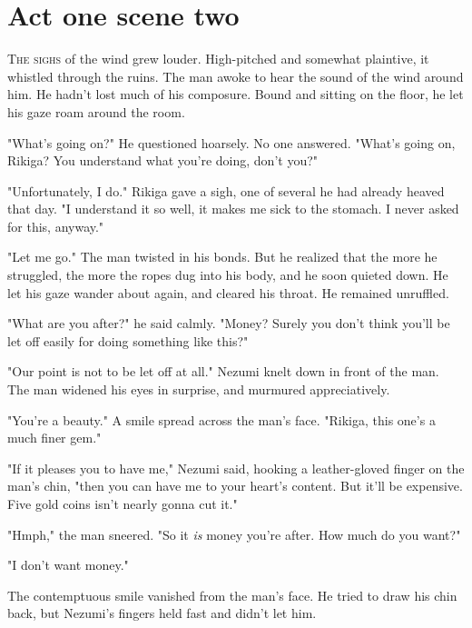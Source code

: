 
\chapter{Act one scene two}


\lettrine{T}{he sighs} of the wind grew louder. High-pitched and somewhat plaintive,
it whistled through the ruins. The man awoke to hear the sound of the
wind around him. He hadn't lost much of his composure. Bound and sitting
on the floor, he let his gaze roam around the room.

"What's going on?" He questioned hoarsely. No one answered. "What's
going on, Rikiga? You understand what you're doing, don't you?"

"Unfortunately, I do." Rikiga gave a sigh, one of several he had already
heaved that day. "I understand it so well, it makes me sick to the
stomach. I never asked for this, anyway."~

"Let me go." The man twisted in his bonds. But he realized that the more
he struggled, the more the ropes dug into his body, and he soon quieted
down. He let his gaze wander about again, and cleared his throat. He
remained unruffled.

"What are you after?" he said calmly. "Money? Surely you don't think
you'll be let off easily for doing something like this?"

"Our point is not to be let off at all." Nezumi knelt down in front of
the man. The man widened his eyes in surprise, and murmured
appreciatively.

"You're a beauty." A smile spread across the man's face. "Rikiga, this
one's a much finer gem."

"If it pleases you to have me," Nezumi said, hooking a leather-gloved
finger on the man's chin, "then you can have me to your heart's content.
But it'll be expensive. Five gold coins isn't nearly gonna cut it."

"Hmph," the man sneered. "So it \emph{is} money you're after. How much do you
want?"

"I don't want money."

The contemptuous smile vanished from the man's face. He tried to draw
his chin back, but Nezumi's fingers held fast and didn't let him.

